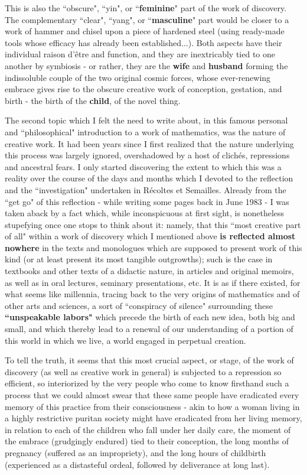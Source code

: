This is also the ``obscure", ``yin", or ``\textbf{feminine}" part of the work of discovery. The complementary ``clear", ``yang", or ``\textbf{masculine}" part would be closer to a work of hammer and chisel upon a piece of hardened steel (using ready-made tools whose efficacy has already been established...). Both aspects have their  individual raison d'\^etre and function, and they are inextricably tied to one another by symbiosis - or rather, they are the \textbf{wife} and \textbf{husband} forming the indissoluble couple of the two original cosmic forces, whose ever-renewing embrace gives rise to the obscure creative work of conception, gestation, and birth - the birth of the \textbf{child}, of the novel thing. 

The second topic which I felt the need to write about, in this famous personal and
``philosophical" introduction to a work of mathematics, was the nature of creative work.
It had been years since I first realized that the nature underlying this process was
largely ignored, overshadowed by a host of clich\'es, repressions and ancestral fears. I only started discovering the extent to which this was a reality over the course of the days and months which I devoted to the reflection and the ``investigation" undertaken in R\'ecoltes et Semailles. Already from the ``get go" of this reflection - while writing some pages back in June 1983 - I was taken aback by a fact which, while inconspicuous at first sight, is nonetheless stupefying once one stops to think about it: namely, that this ``most creative part of all" within a work of discovery which I mentioned above \textbf{is reflected almost nowhere} in the texts and monologues which are supposed to present work of this kind (or at least present its most tangible outgrowths); such is the case in textbooks and other texts of a didactic nature, in articles and original memoirs, as well as in oral lectures, seminary presentations, etc. It is as if there existed, for what seems like millennia, tracing back to the very origins of mathematics and of other arts and sciences, a sort of ``conspiracy of silence" surrounding these \textbf{``unspeakable labors"} which precede the birth of each new idea, both big and small, and which thereby lead to a renewal of our understanding of a portion of this world in which we live, a world engaged in perpetual creation. 

To tell the truth, it seems that this most crucial aspect, or stage, of the work of discovery (as well as creative work in general) is subjected to a repression so efficient, so interiorized by the very people who come to know firsthand such a process that we could almost swear that these same people have eradicated every memory of this practice from their consciousness - akin to how a woman living in a highly restrictive puritan society might have eradicated from her living memory, in relation to each of the children who fall under her daily care, the moment of the embrace (grudgingly endured) tied to their conception, the long months of pregnancy (suffered as an impropriety), and the long hours of childbirth (experienced as a distasteful ordeal, followed by deliverance at long last).

